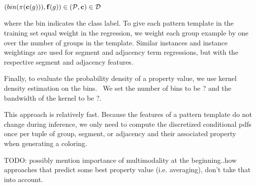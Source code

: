 $(bin(\pi(\mathbf{c}(g))), \mathbf{f}(g)) \in (\mathcal{P}, \mathbf{c}) \in \mathcal{D}$ 

where the bin indicates the class label. To give each pattern template in the training set equal weight in the regression, we weight each group example by one over the number of groups in the template. Similar instances and instance weightings are used for segment and adjacency term regressions, but with the respective segment and adjacency features.~

Finally, to evaluate the probability density of a property value, we use kernel density estimation on the bins.~ We set the number of bins to be ? and the bandwidth of the kernel to be ?.~

This approach is relatively fast. Because the features of a pattern template do not change during inference, we only need to compute the discretized conditional pdfs once per tuple of group, segment, or adjacency and their associated property when generating a coloring.~

TODO: possibly mention importance of multimodality at the beginning..how approaches that predict some best property value (i.e. averaging), don't take that into account.~
